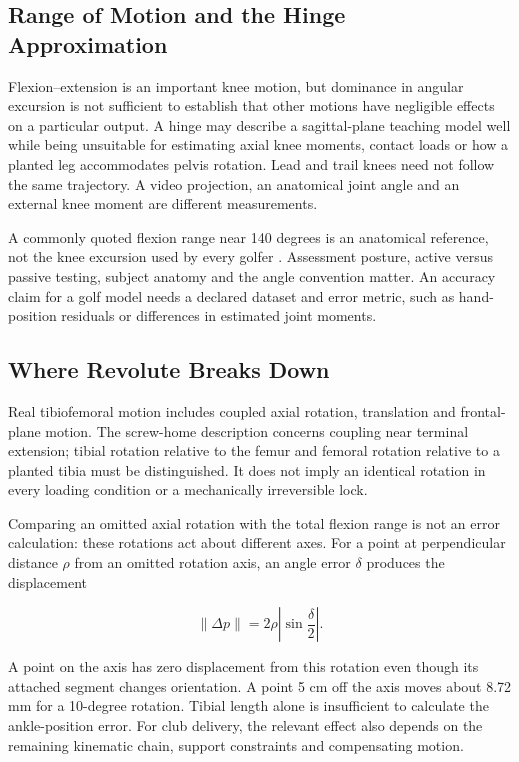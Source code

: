 \subsection{Range of Motion and the Hinge Approximation}\label{range-of-motion-and-the-hinge-approximation}

Flexion--extension is an important knee motion, but dominance in angular excursion is not sufficient to establish that other motions have negligible effects on a particular output. A hinge may describe a sagittal-plane teaching model well while being unsuitable for estimating axial knee moments, contact loads or how a planted leg accommodates pelvis rotation. Lead and trail knees need not follow the same trajectory. A video projection, an anatomical joint angle and an external knee moment are different measurements.

A commonly quoted flexion range near 140 degrees is an anatomical reference, not the knee excursion used by every golfer \citep{Neumann2017}. Assessment posture, active versus passive testing, subject anatomy and the angle convention matter. An accuracy claim for a golf model needs a declared dataset and error metric, such as hand-position residuals or differences in estimated joint moments.

\subsection{Where Revolute Breaks Down}\label{where-revolute-breaks-down}

Real tibiofemoral motion includes coupled axial rotation, translation and frontal-plane motion. The screw-home description concerns coupling near terminal extension; tibial rotation relative to the femur and femoral rotation relative to a planted tibia must be distinguished. It does not imply an identical rotation in every loading condition or a mechanically irreversible lock.

Comparing an omitted axial rotation with the total flexion range is not an error calculation: these rotations act about different axes. For a point at perpendicular distance \(\rho\) from an omitted rotation axis, an angle error \(\delta\) produces the displacement

\[
\|\Delta p\|=2\rho\left|\sin\frac{\delta}{2}\right|.
\]

A point on the axis has zero displacement from this rotation even though its attached segment changes orientation. A point 5 cm off the axis moves about 8.72 mm for a 10-degree rotation. Tibial length alone is insufficient to calculate the ankle-position error. For club delivery, the relevant effect also depends on the remaining kinematic chain, support constraints and compensating motion.

